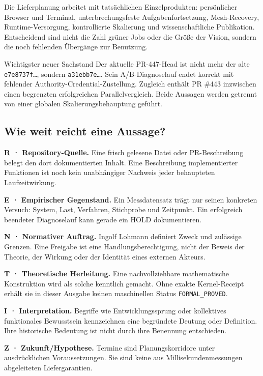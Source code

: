 \begin{cols}
Die Lieferplanung arbeitet mit tatsächlichen Einzelprodukten: persönlicher Browser und Terminal, unterbrechungsfeste Aufgabenfortsetzung, Mesh-Recovery, Runtime-Versorgung, kontrollierte Skalierung und wissenschaftliche Publikation. Entscheidend sind nicht die Zahl grüner Jobs oder die Größe der Vision, sondern die noch fehlenden Übergänge zur Benutzung.

\begin{boundary}{Wichtigster neuer Sachstand}
Der aktuelle PR-447-Head ist nicht mehr der alte \texttt{e7e8737f…}, sondern \texttt{a31ebb7e…}. Sein A/B-Diagnoselauf endet korrekt mit fehlender Authority-Credential-Zustellung. Zugleich enthält PR \#443 inzwischen einen begrenzten erfolgreichen Parallelvergleich. Beide Aussagen werden getrennt von einer globalen Skalierungsbehauptung geführt. 
\end{boundary}
\subsection*{Wie weit reicht eine Aussage?}
\textbf{R · Repository-Quelle.} Eine frisch gelesene Datei oder PR-Beschreibung belegt den dort dokumentierten Inhalt. Eine Beschreibung implementierter Funktionen ist noch kein unabhängiger Nachweis jeder behaupteten Laufzeitwirkung.

\textbf{E · Empirischer Gegenstand.} Ein Messdatensatz trägt nur seinen konkreten Versuch: System, Last, Verfahren, Stichprobe und Zeitpunkt. Ein erfolgreich beendeter Diagnoselauf kann gerade ein HOLD dokumentieren.

\textbf{N · Normativer Auftrag.} Ingolf Lohmann definiert Zweck und zulässige Grenzen. Eine Freigabe ist eine Handlungsberechtigung, nicht der Beweis der Theorie, der Wirkung oder der Identität eines externen Akteurs.

\textbf{T · Theoretische Herleitung.} Eine nachvollziehbare mathematische Konstruktion wird als solche kenntlich gemacht. Ohne exakte Kernel-Receipt erhält sie in dieser Ausgabe keinen maschinellen Status \texttt{FORMAL\_PROVED}.

\textbf{I · Interpretation.} Begriffe wie Entwicklungssprung oder kollektives funktionales Bewusstsein kennzeichnen eine begründete Deutung oder Definition. Ihre historische Bedeutung ist nicht durch ihre Benennung entschieden.

\textbf{Z · Zukunft/Hypothese.} Termine sind Planungskorridore unter ausdrücklichen Voraussetzungen. Sie sind keine aus Millisekundenmessungen abgeleiteten Liefergarantien.


\end{cols}
